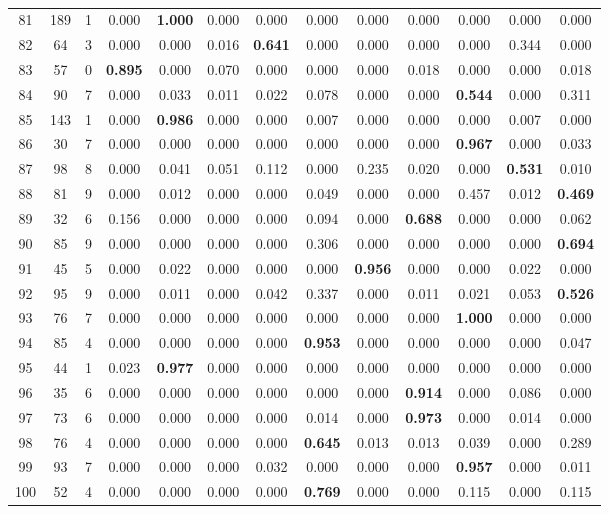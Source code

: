 \documentclass[a4paper,fleqn,usenatbib]{mnras}
\begin{document}
\begin{table*}
\begin{tabular}{|c|c|c|c|c|c|c|c|c|c|c|c|c|}
81 & 189 & 1 & 0.000 & \textbf{1.000} & 0.000 & 0.000 & 0.000 & 0.000 & 0.000 & 0.000 & 0.000 & 0.000\\
82 & 64 & 3 & 0.000 & 0.000 & 0.016 & \textbf{0.641} & 0.000 & 0.000 & 0.000 & 0.000 & 0.344 & 0.000\\
83 & 57 & 0 & \textbf{0.895} & 0.000 & 0.070 & 0.000 & 0.000 & 0.000 & 0.018 & 0.000 & 0.000 & 0.018\\
84 & 90 & 7 & 0.000 & 0.033 & 0.011 & 0.022 & 0.078 & 0.000 & 0.000 & \textbf{0.544} & 0.000 & 0.311\\
85 & 143 & 1 & 0.000 & \textbf{0.986} & 0.000 & 0.000 & 0.007 & 0.000 & 0.000 & 0.000 & 0.007 & 0.000\\
86 & 30 & 7 & 0.000 & 0.000 & 0.000 & 0.000 & 0.000 & 0.000 & 0.000 & \textbf{0.967} & 0.000 & 0.033\\
87 & 98 & 8 & 0.000 & 0.041 & 0.051 & 0.112 & 0.000 & 0.235 & 0.020 & 0.000 & \textbf{0.531} & 0.010\\
88 & 81 & 9 & 0.000 & 0.012 & 0.000 & 0.000 & 0.049 & 0.000 & 0.000 & 0.457 & 0.012 & \textbf{0.469}\\
89 & 32 & 6 & 0.156 & 0.000 & 0.000 & 0.000 & 0.094 & 0.000 & \textbf{0.688} & 0.000 & 0.000 & 0.062\\
90 & 85 & 9 & 0.000 & 0.000 & 0.000 & 0.000 & 0.306 & 0.000 & 0.000 & 0.000 & 0.000 & \textbf{0.694}\\
91 & 45 & 5 & 0.000 & 0.022 & 0.000 & 0.000 & 0.000 & \textbf{0.956} & 0.000 & 0.000 & 0.022 & 0.000\\
92 & 95 & 9 & 0.000 & 0.011 & 0.000 & 0.042 & 0.337 & 0.000 & 0.011 & 0.021 & 0.053 & \textbf{0.526}\\
93 & 76 & 7 & 0.000 & 0.000 & 0.000 & 0.000 & 0.000 & 0.000 & 0.000 & \textbf{1.000} & 0.000 & 0.000\\
94 & 85 & 4 & 0.000 & 0.000 & 0.000 & 0.000 & \textbf{0.953} & 0.000 & 0.000 & 0.000 & 0.000 & 0.047\\
95 & 44 & 1 & 0.023 & \textbf{0.977} & 0.000 & 0.000 & 0.000 & 0.000 & 0.000 & 0.000 & 0.000 & 0.000\\
96 & 35 & 6 & 0.000 & 0.000 & 0.000 & 0.000 & 0.000 & 0.000 & \textbf{0.914} & 0.000 & 0.086 & 0.000\\
97 & 73 & 6 & 0.000 & 0.000 & 0.000 & 0.000 & 0.014 & 0.000 & \textbf{0.973} & 0.000 & 0.014 & 0.000\\
98 & 76 & 4 & 0.000 & 0.000 & 0.000 & 0.000 & \textbf{0.645} & 0.013 & 0.013 & 0.039 & 0.000 & 0.289\\
99 & 93 & 7 & 0.000 & 0.000 & 0.000 & 0.032 & 0.000 & 0.000 & 0.000 & \textbf{0.957} & 0.000 & 0.011\\
100 & 52 & 4 & 0.000 & 0.000 & 0.000 & 0.000 & \textbf{0.769} & 0.000 & 0.000 & 0.115 & 0.000 & 0.115\\
\hline
\end{tabular}
\caption{}
\label{tab:mnist_clustering}
\end{table*}
\end{document}
